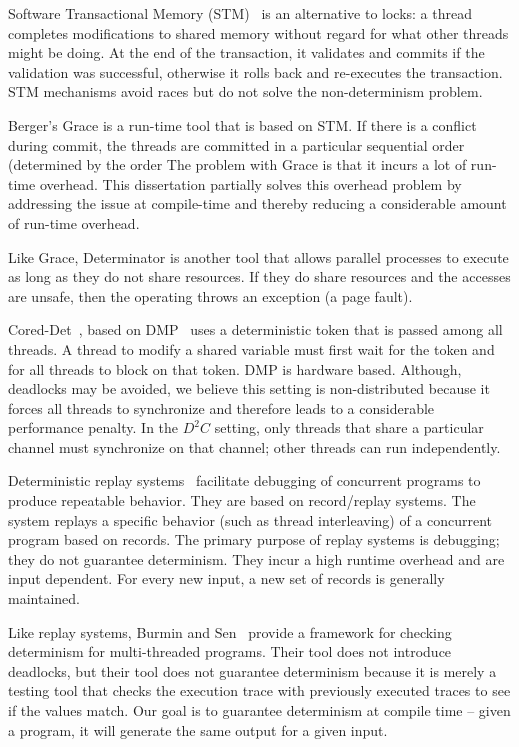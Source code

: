 \documentclass[10pt, conference, compsocconf]{IEEEtran}
\begin{document}
Software Transactional Memory (STM)~\cite{shavit1995software}
  is an alternative to locks: a thread completes modifications to 
shared memory without regard for what other threads might be doing. At the end of the transaction,
it validates and commits if the validation was successful, otherwise it rolls back and re-executes
the transaction. STM mechanisms avoid races but do not solve the non-determinism problem.

Berger's Grace\cite{berger2009grace} is a run-time tool
that is based on STM. 
If there is a conflict during commit, the threads are committed in
a particular sequential order (determined by the order
The problem with Grace is that it incurs a lot of run-time
overhead. This dissertation  partially solves this overhead problem
by addressing the issue at compile-time and
thereby reducing a considerable amount of run-time overhead.



Like Grace, Determinator\cite{aviram2010efficient} is another tool
that allows parallel processes to execute as long as they do not share 
resources. If they do share resources and the accesses are unsafe, then
the operating throws an exception (a page fault). 

Cored-Det~\cite{bergan2010coreDet}, based on DMP~\cite{devietti2009dmp} 
uses a deterministic token that is passed
among all threads.  A thread to modify a shared variable must first
wait for the token and for all threads to block on that
token. DMP is hardware based. 
Although, deadlocks may be avoided, we believe this setting is
non-distributed because it forces all threads to synchronize and
therefore leads to a considerable performance penalty. In the $D^2C$ 
setting, only threads that share a particular channel must synchronize
on that channel; other threads can run independently.

 Deterministic replay systems~\cite{choi1998deterministic,altekar2009odr} facilitate debugging of concurrent programs to produce
repeatable behavior. They are based on record/replay systems. The system
replays a specific behavior (such as thread interleaving) of a concurrent
program based on records. The primary purpose of replay systems 
is debugging; they do not guarantee determinism. 
They incur a high runtime overhead and are input dependent.
For every new input, a new set of records is generally maintained.

Like replay systems, Burmin and Sen~\cite{Burnim2009asserting} provide a framework for
checking determinism for multi-threaded programs. Their tool does not
introduce deadlocks, but their tool does not guarantee determinism
because it is merely a testing tool that checks the execution trace
with previously executed traces to see if the values match. Our
goal is to guarantee determinism at compile time -- given a program,
it will generate the same output for a given input.
\end{document}
